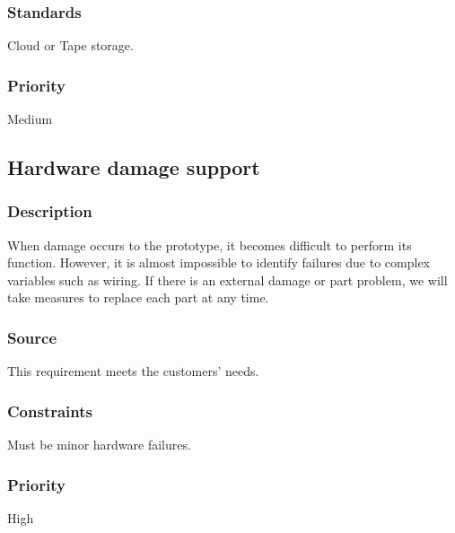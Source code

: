 \subsubsection{Standards}
Cloud or Tape storage.
\subsubsection{Priority}
Medium

\subsection{Hardware damage support}
\subsubsection{Description}
When damage occurs to the prototype, it becomes difficult to perform its function. However, it is almost impossible to identify failures due to complex variables such as wiring. If there is an external damage or part problem, we will take measures to replace each part at any time.
\subsubsection{Source}
This requirement meets the customers' needs.
\subsubsection{Constraints}
Must be minor hardware failures.
\subsubsection{Priority}
High